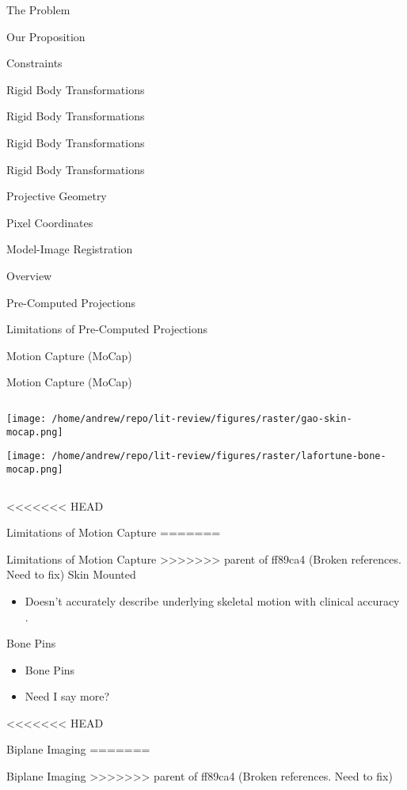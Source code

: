 \documentclass[presentation, aspectratio=1610]{beamer}
\begin{document}
\begin{frame}[label={sec:org51bdd62}]{The Problem}
\begin{frame}[label={sec:org827823c}]{Our Proposition}
\begin{frame}[label={sec:org8655799}]{Constraints}
\begin{frame}[label={sec:orgb624cd0}]{Rigid Body Transformations}
\begin{frame}[label={sec:org66cfa5c}]{Rigid Body Transformations}
\begin{frame}[label={sec:orga8040ec}]{Rigid Body Transformations}
\begin{frame}[label={sec:org2c45bb0}]{Rigid Body Transformations}
\begin{frame}[label={sec:orgc08b8a8}]{Projective Geometry}
\begin{frame}[label={sec:org9004faf}]{Pixel Coordinates}
\begin{frame}[label={sec:orgf5a9f37}]{Model-Image Registration}
\begin{frame}[label={sec:orgd132949}]{Overview}
\begin{frame}[label={sec:org3bacc15}]{Pre-Computed Projections}
\begin{frame}[label={sec:org9c71b5d}]{Limitations of Pre-Computed Projections}
\begin{frame}[label={sec:org0b4ee4b}]{Motion Capture (MoCap)}
\begin{frame}[label={sec:org5b44d59}]{Motion Capture (MoCap)}
\begin{columns}
\begin{column}{0.6\columnwidth}
\begin{center}
\texttt{[image: /home/andrew/repo/lit-review/figures/raster/gao-skin-mocap.png]}
\end{center}
\begin{center}
\texttt{[image: /home/andrew/repo/lit-review/figures/raster/lafortune-bone-mocap.png]}
\end{center}
\end{column}
\end{columns}
\end{frame}
<<<<<<< HEAD
\begin{frame}[label={sec:org8d150bb}]{Limitations of Motion Capture}
=======
\begin{frame}[label={sec:orge923dea}]{Limitations of Motion Capture}
>>>>>>> parent of ff89ca4 (Broken references. Need to fix)
Skin Mounted
\begin{itemize}
\item Doesn't accurately describe underlying skeletal motion with clinical accuracy \autocites{gaoInvestigationSoftTissue2008}[][]{kuoInfluenceSoftTissue2011}[][]{linEffectsSoftTissue2016}.
\end{itemize}
Bone Pins
\begin{itemize}
\item Bone Pins
\item Need I say more?
\end{itemize}
\end{frame}
<<<<<<< HEAD
\begin{frame}[label={sec:orgb0b4d92}]{Biplane Imaging}
=======
\begin{frame}[label={sec:org229b898}]{Biplane Imaging}
>>>>>>> parent of ff89ca4 (Broken references. Need to fix)
\begin{columns}
\begin{column}{0.5\columnwidth}
\begin{itemize}

\end{itemize}
\end{column}
\end{columns}
\end{frame}
\end{frame}
\end{frame}
\end{frame}
\end{frame}
\end{frame}
\end{frame}
\end{frame}
\end{frame}
\end{frame}
\end{frame}
\end{frame}
\end{frame}
\end{frame}
\end{frame}
\end{frame}
\end{frame}
\end{document}

